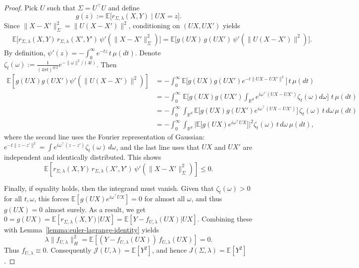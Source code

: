 \documentclass[sn-mathphys-num]{sn-jnl}%
\numberwithin{equation}{section}
\newcommand{\R}{\mathbb{R}}
\newcommand{\E}{\mathbb{E}}
\theoremstyle{thmstyleone}%
\theoremstyle{thmstyletwo}%
\theoremstyle{thmstylethree}%
\begin{document}
\begin{proof} 
Pick $U$ such that $\Sigma = U^\top U$ and define
\[
g(z) := \E\big[r_{\Sigma,\lambda}(X,Y)\mid UX = z\big].
\]
Since $\|X-X'\|_{\Sigma}^2 = \|U(X-X')\|^2$, conditioning on $(UX,UX')$ yields
\[
\begin{aligned}
&\E\bigl[
  r_{\Sigma,\lambda}(X,Y)\,r_{\Sigma,\lambda}(X',Y')\,
  \psi'(\|X-X'\|_{\Sigma}^2)
\bigr] 
=
\E\bigl[g(UX)\,g(UX')\,\psi'(\|U(X-X')\|^2)\bigr].
\end{aligned}
\]
By definition, $\psi'(z)=-\int_0^\infty e^{-tz}\,t\,\mu(dt)$. Denote $\zeta_t(\omega):=\frac{1}{(4\pi t)^{d/2}}e^{-\|\omega\|^2/(4t)}$. Then 
\[
\begin{aligned}
\E[g(UX)g(UX')\psi'(\|U(X-X')\|^2)]
&=
-\int_0^\infty
\E\big[g(UX)g(UX')e^{-t\|UX-UX'\|^2}\big]\,
t\,\mu(dt) \\
&=
-\int_0^\infty\,
\E\big[g(UX)g(UX')\int_{\R^d} e^{i\omega^\top(UX-UX')}\zeta_t(\omega) d\omega \big]\,
\,t\,\mu(dt) \\
&=
-\int_0^\infty\!\!\int_{\R^d}
\E\big[g(UX)g(UX')e^{i\omega^\top(UX-UX')}\big]\,
\zeta_t(\omega)\,t\,d\omega\,\mu(dt) \\
&=
-\int_0^\infty\!\!\int_{\R^d}
\bigl|\E\big[g(UX)e^{i\omega^\top UX}\big]\bigr|^2
\zeta_t(\omega)\,t\,d\omega\,\mu(dt),
\end{aligned}
\]
where the second line uses the Fourier representation of Gaussian: 
$e^{-t\|z-z'\|^2}
=
\int
e^{i\omega^\top(z-z')}\zeta_t(\omega)\,d\omega$, and the last line uses that
$UX$ and $UX'$ are independent and identically distributed. This shows
\[
\E\!\left[
r_{\Sigma,\lambda}(X,Y)\,r_{\Sigma,\lambda}(X',Y')\,
\psi'(\|X-X'\|_{\Sigma}^2)
\right]
\le 0.
\]

Finally, if equality holds, then the integrand must vanish. Given that
$\zeta_t(\omega)>0$ for all $t,\omega$, this forces
$\E[g(UX)e^{i\omega^\top UX}]=0$ for almost all $\omega$, and thus
$g(UX)=0$ almost surely. As a result, we get $0 = g(UX) = \E[r_{\Sigma, \lambda}(X, Y)|UX] = 
\E[Y-f_{U,\lambda}(UX)| UX]$. 
Combining these with Lemma~\ref{lemma:euler-lagrange-identity} yields
\begin{equation*}
\lambda\|f_{U,\lambda}\|_H^2
=\E[(Y-f_{U,\lambda}(UX))\,f_{U,\lambda}(UX)] = 0.
\end{equation*}
Thus $f_{U,\lambda}\equiv 0$. Consequently $\mathcal{J}(U,\lambda)=\E[Y^2]$, and hence
$J(\Sigma,\lambda)=\E[Y^2]$.

\end{proof} 

\end{document}
